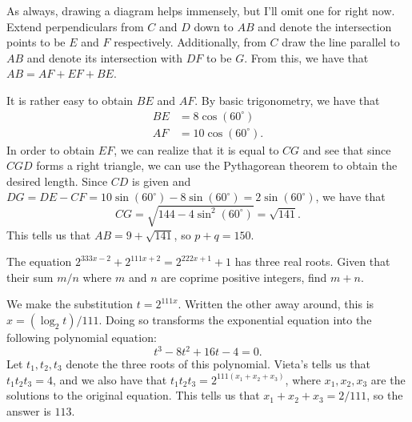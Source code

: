 \documentclass[a4paper, 12pt]{article}
\begin{document}
\begin{solution}
    As always, drawing a diagram helps immensely, but I'll omit one for right now. Extend perpendiculars from \( C \) and \( D \) down to \( AB \) and denote the intersection points to be \( E \) and \( F \) respectively. Additionally, from \( C \) draw the line parallel to \( AB \) and denote its intersection with \( DF  \) to be \( G \). From this, we have that \( AB = AF + EF + BE \).

    It is rather easy to obtain \( BE \) and \( AF \). By basic trigonometry, we have that
    \begin{align*}
        BE &= 8 \cos{\left( 60^\circ \right)} \\
        AF &= 10 \cos{\left( 60^\circ \right)}
    .\end{align*}
    In order to obtain \( EF \), we can realize that it is equal to \( CG \) and see that since \( CGD \) forms a right triangle, we can use the Pythagorean theorem to obtain the desired length. Since \( CD \) is given and \( DG = DE - CF = 10 \sin{\left( 60^\circ \right)} - 8 \sin{\left( 60^\circ \right)} = 2 \sin{\left( 60^\circ \right)} \), we have that
    \[
        CG = \sqrt{144 - 4 \sin^2{\left( 60^\circ \right)}} = \sqrt{141}
    .\]
    This tells us that \( AB = 9 + \sqrt{141} \), so \( p + q = \boxed{150} \).
\end{solution}

\begin{chirpbox}
    \begin{problemnum}
        The equation \( 2^{333x-2} + 2^{111x + 2} = 2^{222x+1} + 1 \) has three real roots. Given that their sum \( m / n \) where \( m \) and \( n \) are coprime positive integers, find \( m + n \).
    \end{problemnum}
\end{chirpbox}

\begin{solution}
    We make the substitution \( t = 2^{111x} \). Written the other away around, this is \( x = (\log_2{t}) / 111 \). Doing so transforms the exponential equation into the following polynomial equation:
    \[
        t^3 - 8 t^2 + 16t - 4 = 0
    .\]
    Let \( t_1, t_2, t_3 \) denote the three roots of this polynomial. Vieta's tells us that \( t_1 t_2 t_3 = 4 \), and we also have that \( t_1 t_2 t_3 = 2^{111(x_1 + x_2 + x_3)} \), where \( x_1, x_2, x_3 \) are the solutions to the original equation. This tells us that \( x_1 + x_2 + x_3 = 2 / 111 \), so the answer is \( \boxed{113} \).
\end{solution}
\end{document}
